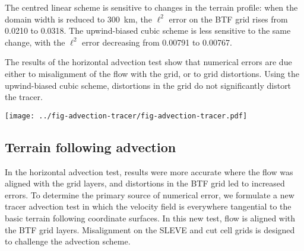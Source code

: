 \documentclass[twocol]{ametsoc}
\begin{document}
The centred linear scheme is sensitive to changes in the terrain profile: when the domain width is reduced to \SI{300}{\kilo\meter}, the $\ell^2$ error on the BTF grid rises from \num{0.0210} to \num{0.0318}.  The upwind-biased cubic scheme is less sensitive to the same change, with the $\ell^2$ error decreasing from \num{0.00791} to \num{0.00767}.

The results of the horizontal advection test show that numerical errors are due either to misalignment of the flow with the grid, or to grid distortions.  Using the upwind-biased cubic scheme, distortions in the grid do not significantly distort the tracer.

\begin{figure*}
	\centering
	\texttt{[image: ../fig-advection-tracer/fig-advection-tracer.pdf]}
%
	\caption{Horizontally advected tracer contours at \(t = \SI{0}{\second}\), \SI{5000}{\second} and \SI{10000}{\second} using (a) centred linear scheme on a BTF grid, the upwind-biased cubic scheme on (b) the cut cell grid, (d) the BTF grid, and (c) the fourth order scheme from \citet{schaer2002} on the BTF grid, with contour intervals every 0.1.  Errors on the BTF grid at \(t = \SI{10000}{\second}\) are shown for (e) the fourth order scheme from \citet{schaer2002}, and (f) the upwind-biased cubic scheme, with contour intervals every 0.01.  Negative contours denoted by dotted lines.  The terrain profile is also shown immediately above the $x$ axis.  Subfigures (c) and (e) produced using the modified version of the code from \citet{schaer2002}.}
	\label{fig:advection-tracer}
\end{figure*}


\subsection{Terrain following advection}
In the horizontal advection test, results were more accurate where the flow was aligned with the grid layers, and distortions in the BTF grid led to increased errors.  To determine the primary source of numerical error, we formulate a new tracer advection test in which the velocity field is everywhere tangential to the basic terrain following coordinate surfaces.  In this new test, flow is aligned with the BTF grid layers.  Misalignment on the SLEVE and cut cell grids is designed to challenge the advection scheme.
\end{document}
